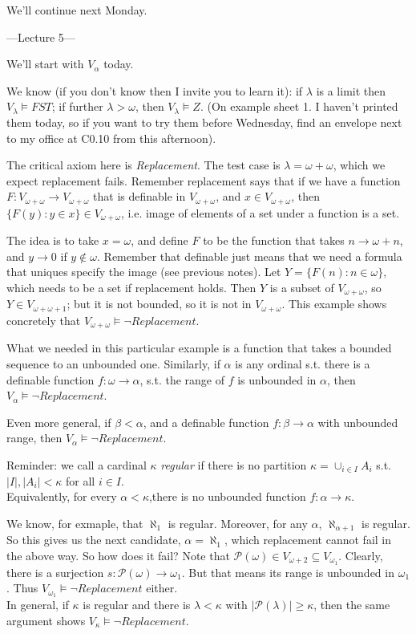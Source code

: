 \documentclass[a4paper]{article}
\begin{document}
We'll continue next Monday.

---Lecture 5---

We'll start with $V_\alpha$ today.

We know (if you don't know then I invite you to learn it): if $\lambda$ is a limit then $V_\lambda \vDash FST$; if further $\lambda > \omega$, then $V_\lambda \vDash Z$. (On example sheet 1. I haven't printed them today, so if you want to try them before Wednesday, find an envelope next to my office at C0.10 from this afternoon). 

The critical axiom here is \emph{Replacement}. The test case is $\lambda = \omega + \omega$, which we expect replacement fails. Remember replacement says that if we have a function $F:V_{\omega + \omega} \to V_{\omega + \omega}$ that is definable in $V_{\omega + \omega}$, and $x \in V_{\omega+\omega}$, then $\{F(y):y \in x\} \in V_{\omega+\omega}$, i.e. image of elements of a set under a function is a set.

The idea is to take $x=\omega$, and define $F$ to be the function that takes $n \to \omega+n$, and $y \to 0$ if $y \not\in \omega$. Remember that definable just means that we need a formula that uniques specify the image (see previous notes). Let $Y=\{F(n):n \in \omega\}$, which needs to be a set if replacement holds. Then $Y$ is a subset of $V_{\omega+\omega}$, so $Y \in V_{\omega+\omega+1}$; but it is not bounded, so it is not in $V_{\omega+\omega}$. This example shows concretely that $V_{\omega+\omega} \vDash \neg Replacement$.

What we needed in this particular example is a function that takes a bounded sequence to an unbounded one. Similarly, if $\alpha$ is any ordinal s.t. there is a definable function $f:\omega \to \alpha$, s.t. the range of $f$ is unbounded in $\alpha$, then $V_\alpha \vDash \neg Replacement$.

Even more general, if $\beta < \alpha$, and a definable function $f:\beta \to \alpha$ with unbounded range, then $V_\alpha \vDash \neg Replacement$.

Reminder: we call a cardinal $\kappa$ \emph{regular} if there is no partition $\kappa = \cup_{i \in I} A_i$ s.t. $|I|,|A_i| < \kappa$ for all $i \in I$.\\
Equivalently, for every $\alpha < \kappa$,there is no unbounded function $f:\alpha \to \kappa$.

We know, for exmaple, that $\aleph_1$ is regular. Moreover, for any $\alpha$, $\aleph_{\alpha+1}$ is regular. So this gives us the next candidate, $\alpha=\aleph_1$, which replacement cannot fail in the above way. So how does it fail? Note that $\mathcal{P}(\omega) \in V_{\omega+2} \subseteq V_{\omega_1}$. Clearly, there is a surjection $s:\mathcal{P}(\omega) \to \omega_1$. But that means its range is unbounded in $\omega_1$. Thus $V_{\omega_1} \vDash \neg Replacement$ either.\\
In general, if $\kappa$ is regular and there is $\lambda < \kappa$ with $|\mathcal{P}(\lambda)| \geq \kappa$, then the same argument shows $V_\kappa \vDash \neg Replacement$. 
\end{document}
